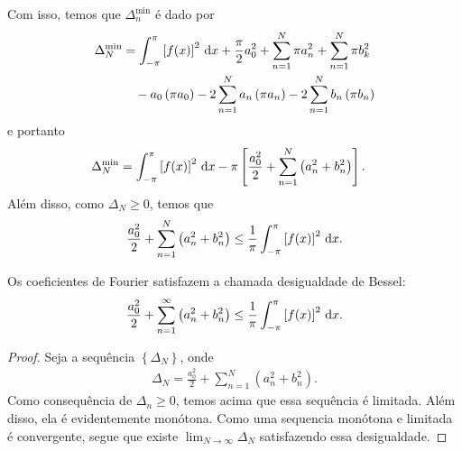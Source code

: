 Com isso, temos que $\Delta_n^{\min}$ \'{e} dado por
\begin{align*}
    \begin{split}
        \Delta_N^{\min} &= \int_{-\pi}^\pi \left[ f(x) \right]^2 \, \mathrm{d}x + \frac{\pi}{2} a_0^2 + \sum_{n = 1}^N \pi a_n^2 + \sum_{n = 1}^N \pi b_k^2 \\
        &\quad {}- a_0 \left( \pi a_0 \right) - 2 \sum_{n = 1}^N a_n \left( \pi a_n \right) - 2 \sum_{n = 1}^N b_n \left( \pi b_n \right)
    \end{split}
\end{align*}
e portanto
\begin{align*}
    \Delta_N^{\min} &= \int_{-\pi}^\pi \left[ f(x) \right]^2 \, \mathrm{d}x - \pi \left[ \frac{a_0^2}{2} + \sum_{n = 1}^N \left( a_n^2 + b_n^2 \right) \right].
\end{align*}
Al\'{e}m disso, como $\Delta_N \geq 0$, temos que
\begin{align*}
    \frac{a_0^2}{2} + \sum_{n = 1}^N \left( a_n^2 + b_n^2 \right) \leq \frac{1}{\pi} \int_{-\pi}^\pi \left[ f(x) \right]^2 \, \mathrm{d}x.
\end{align*}

\begin{prop}
    Os coeficientes de Fourier satisfazem a chamada desigualdade de Bessel:
    \begin{align*}
        \frac{a_0^2}{2} + \sum_{n = 1}^\infty \left( a_n^2 + b_n^2 \right) \leq \frac{1}{\pi} \int_{-\pi}^\pi \left[ f(x) \right]^2 \, \mathrm{d}x.
    \end{align*}
\end{prop}
\begin{proof}
    Seja a sequ\^{e}ncia $\left\{ \Delta_N \right\}$, onde
    \begin{align*}
        \Delta_N = \frac{a_0^2}{2} + \sum_{n = 1}^N \left( a_n^2 + b_n^2 \right).
    \end{align*}
    Como consequ\^{e}ncia de $\Delta_n \geq 0$, temos acima que essa sequ\^{e}ncia \'{e} limitada. Al\'{e}m disso, ela \'{e} evidentemente mon\'{o}tona. Como uma sequencia mon\'{o}tona e limitada \'{e} convergente, segue que existe $\lim_{N \to \infty} \Delta_N$ satisfazendo essa desigualdade.
\end{proof}

